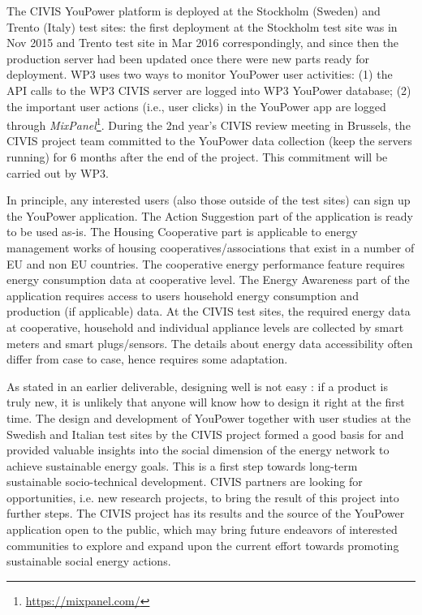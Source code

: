The CIVIS YouPower platform is deployed at the Stockholm (Sweden) and Trento (Italy) test sites:  the first deployment at the Stockholm test site was in Nov 2015 and Trento test site in Mar 2016 correspondingly, and since then the production server had been updated once there were new parts ready for deployment. WP3 uses two ways to monitor YouPower user activities: (1) the API calls to the WP3 CIVIS server are logged into WP3 YouPower database; (2) the important user actions (i.e., user clicks) in the YouPower app are logged  through \textit{MixPanel}\footnote{\url{https://mixpanel.com/}}.
During the 2nd year's CIVIS review meeting in Brussels, the CIVIS project team committed to the YouPower data collection (keep the servers running) for 6 months after the end of the project. This commitment will be carried out by WP3. 

In principle, any interested users (also those outside of the test sites) can sign up the YouPower application. The Action Suggestion part of the application is ready to be used as-is. The Housing Cooperative part is applicable to energy management works of housing cooperatives/associations that exist in a number of EU and non EU countries. The cooperative energy performance feature requires energy consumption data at cooperative level. The Energy Awareness part of the application requires access to users household energy consumption and production (if applicable) data. At the CIVIS test sites, the required energy data at cooperative, household and individual appliance levels are collected by smart meters and smart plugs/sensors. The details about energy data accessibility often differ from case to case, hence requires some adaptation. 

As stated in an earlier deliverable, designing well is not easy \citep{Norman2002}: if a product is truly new, it is unlikely that anyone will know how to design it right at the first time.  
The design and development of YouPower together with user studies at the Swedish and Italian test sites by the CIVIS project formed a good basis for and provided valuable insights into the social dimension of the energy network to achieve sustainable energy goals. This is a first step towards long-term sustainable socio-technical development.  
CIVIS partners are looking for opportunities, i.e. new research projects, to bring the result of this project into further steps. The CIVIS project has its results and the source of the YouPower application open to the public, which may bring future endeavors of interested communities to explore and expand upon the current effort towards promoting sustainable social energy actions. 



